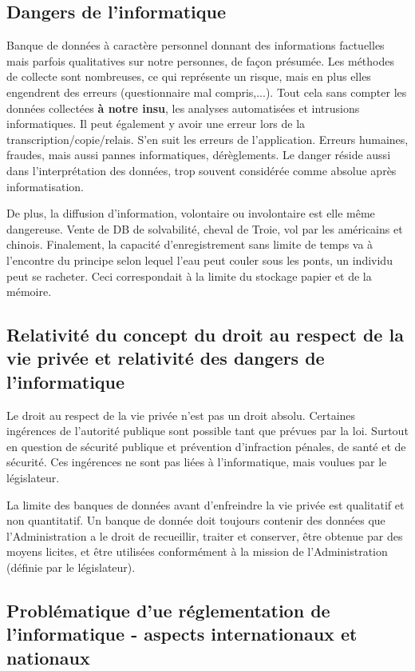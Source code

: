 \documentclass[fleqn,letterpaper, 12pt]{article}
\begin{document}
	\subsection{Dangers de l'informatique}
	
	Banque de données à caractère personnel donnant des informations factuelles mais parfois qualitatives sur notre personnes, de façon présumée. Les méthodes de collecte sont nombreuses, ce qui représente un risque, mais en plus elles engendrent des erreurs (questionnaire mal compris,...). Tout cela sans compter les données collectées \textbf{à notre insu}, les analyses automatisées et intrusions informatiques. Il peut également y avoir une erreur lors de la transcription/copie/relais. S'en suit les erreurs de l'application. Erreurs humaines, fraudes, mais aussi pannes informatiques, dérèglements. Le danger réside aussi dans l'interprétation des données, trop souvent considérée comme absolue après informatisation.
	
	De plus, la diffusion d'information, volontaire ou involontaire est elle même dangereuse. Vente de DB de solvabilité, cheval de Troie, vol par les américains et chinois. Finalement, la capacité d'enregistrement sans limite de temps va à l'encontre du principe selon lequel l'eau peut couler sous les ponts, un individu peut se racheter. Ceci correspondait à la limite du stockage papier et de la mémoire.
	
	
	
	\subsection{Relativité du concept du droit au respect de la vie privée et relativité des dangers de l'informatique}
	
	Le droit au respect de la vie privée n'est pas un droit absolu. Certaines ingérences de l'autorité publique sont possible tant que prévues par la loi. Surtout en question de sécurité publique et prévention d'infraction pénales, de santé et de sécurité. Ces ingérences ne sont pas liées à l'informatique, mais voulues par le législateur.
	
	La limite des banques de données avant d'enfreindre la vie privée est qualitatif et non quantitatif. Un banque de donnée doit toujours contenir des données que l'Administration a le droit de recueillir, traiter et conserver, être obtenue par des moyens licites, et être utilisées conformément à la mission de l'Administration (définie par le législateur).
	
	
	\subsection{Problématique d'ue réglementation de l'informatique - aspects internationaux et nationaux}
	
\end{document}
